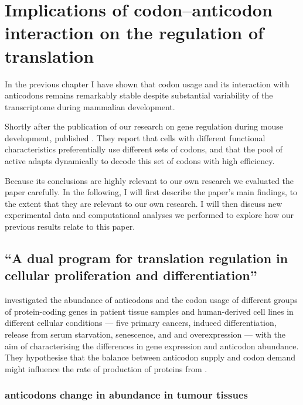 \chapter{Implications of codon–anticodon interaction on the regulation of
translation}
\label{sec:codons}

In the previous chapter I have shown that codon usage and its interaction with
\trna anticodons remains remarkably stable despite substantial variability of
the transcriptome during mammalian development.

Shortly after the publication of our research on \trna gene regulation during
mouse development, \citet{Gingold:2014} published . They
report that cells with different functional characteristics preferentially use
different sets of codons, and that the pool of active \trna[s] adapts
dynamically to decode this set of codons with high efficiency.

Because its conclusions are highly relevant to our own research we evaluated the
paper carefully. In the following, I will first describe the paper’s main
findings, to the extent that they are relevant to our own research. I will then
discuss new experimental data and computational analyses we performed to explore
how our previous results relate to this paper.

\section{“A dual program for translation regulation in cellular proliferation
and differentiation”}

\citet{Gingold:2014} investigated the abundance of \trna anticodons and the
codon usage of different groups of protein-coding genes in patient tissue
samples and human-derived cell lines in different cellular conditions --- five
primary cancers, induced differentiation, release from serum starvation,
senescence, and  and  overexpression --- with the
aim of characterising the differences in \trna gene expression and \trna
anticodon abundance. They hypothesise that the balance between \trna anticodon
supply and codon demand might influence the rate of production of proteins from
\mrna \citep{Gingold:2011}.

\subsection{ anticodons change in abundance in tumour tissues}

